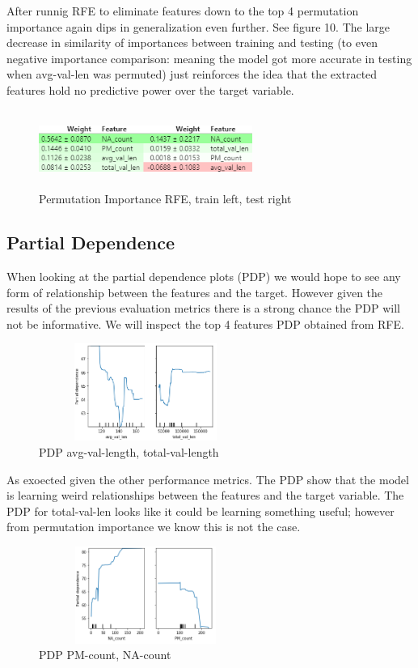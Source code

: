 \documentclass[conference]{IEEEtran}
\begin{document}
After runnig RFE to eliminate features down to the top 4 permutation importance again dips in generalization even further. See figure 10. The large decrease in similarity of importances between training and testing (to even negative importance comparison: meaning the model got more accurate in testing when avg-val-len was permuted) just reinforces the idea that the extracted features hold no predictive power over the target variable.

\begin{figure}[h]
\centerline{\includegraphics[width=2.75in, height=1.0in]{rfeperm.PNG}}
\caption{Permutation Importance RFE, train left, test right}
\label{fig}
\end{figure}

\subsection{Partial Dependence}
When looking at the partial dependence plots (PDP) we would hope to see any form of relationship between the features and the target. However given the results of the previous evaluation metrics there is a strong chance the PDP will not be informative. We will inspect the top 4 features PDP obtained from RFE.

\begin{figure}[h]
\centerline{\includegraphics[width=2.75in, height=1.25in]{pdp01.PNG}}
\caption{PDP avg-val-length, total-val-length}
\label{fig}
\end{figure}

As exoected given the other performance metrics. The PDP show that the model is learning weird relationships between the features and the target variable. The PDP for total-val-len looks like it could be learning something useful; however from permutation importance we know this is not the case.

\begin{figure}[h]
\centerline{\includegraphics[width=2.75in, height=1.25in]{pdpna.PNG}}
\caption{PDP PM-count, NA-count}
\label{fig}
\end{figure}
\end{document}
